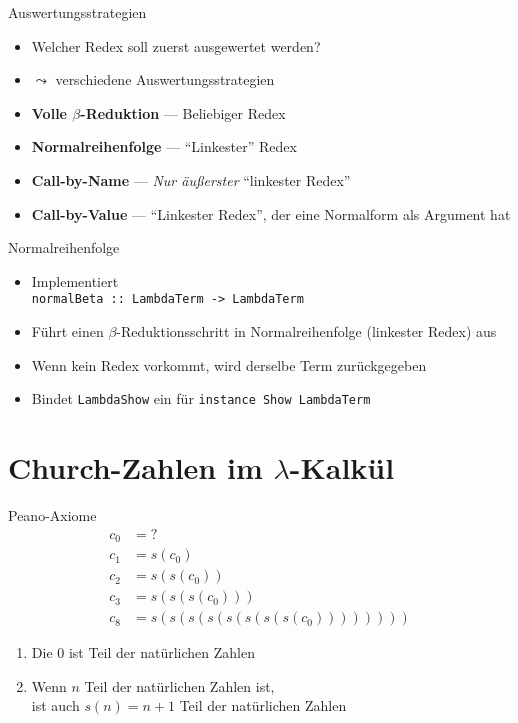 \documentclass{beamer}
\begin{document}
\begin{frame}{Auswertungsstrategien}
	\begin{itemize}
		\item Welcher Redex soll zuerst ausgewertet werden?
		\item $\leadsto$ verschiedene Auswertungsstrategien
	\end{itemize}
	\pause
	\vspace{1cm}
	\begin{itemize}
		\item \textbf{Volle $\beta$-Reduktion} --- Beliebiger Redex
		\item \textbf{Normalreihenfolge} --- \enquote{Linkester} Redex
		\pause
		\item \textbf{Call-by-Name} --- \emph{Nur äußerster} \enquote{linkester Redex}
		\item \textbf{Call-by-Value} --- \enquote{Linkester Redex}, der eine Normalform als Argument hat
	\end{itemize}
\end{frame}

\begin{frame}{Normalreihenfolge}
	\begin{itemize}
		\item Implementiert\\
		      \texttt{normalBeta :: LambdaTerm -> LambdaTerm}
	        \item Führt einen $\beta$-Reduktionsschritt in Normalreihenfolge (linkester Redex) aus
		\item Wenn kein Redex vorkommt, wird derselbe Term zurückgegeben
		\item Bindet \texttt{LambdaShow} ein für \texttt{instance Show LambdaTerm}
	\end{itemize}
\end{frame}

\section{Church-Zahlen im $\lambda$-Kalkül}

\begin{frame}{Peano-Axiome}
	\begin{eqnarray*}
		c_0 &= ?\\
		c_1 &= s (c_0)\\
		c_2 &= s (s (c_0))\\
		c_3 &= s (s (s (c_0)))\\
		c_8 &= s (s (s (s (s (s (s (s (c_0))))))))
	\end{eqnarray*}

	\begin{enumerate}
		\item Die 0 ist Teil der natürlichen Zahlen
		\item Wenn $n$ Teil der natürlichen Zahlen ist,\\
	 	      ist auch $s(n) = n + 1$ Teil der natürlichen Zahlen
	\end{enumerate}
\end{frame}
\end{document}
